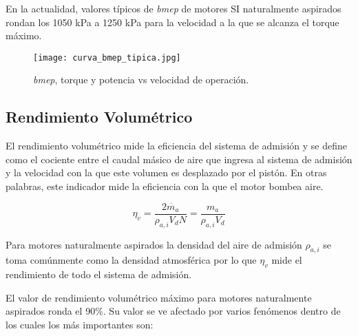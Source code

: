 En la actualidad, valores típicos de \emph{bmep} de motores SI naturalmente
aspirados rondan los 1050 kPa a 1250 kPa para la velocidad a la que se alcanza
el torque máximo.

\begin{figure} \centering
\texttt{[image: curva\_bmep\_tipica.jpg]}
    \caption{\emph{bmep}, torque y potencia vs velocidad de
operación\parencite{heywood}.}
    \label{fig:bmep_tipica}
\end{figure}


\subsection{Rendimiento Volumétrico}
%
El rendimiento volumétrico mide la eficiencia del sistema de admisión y se
define como el cociente entre el caudal másico de aire que ingresa al sistema de
admisión y la velocidad con la que este volumen es desplazado por el pistón.
%
En otras palabras, este indicador mide la eficiencia con la que el motor bombea
aire.

\begin{equation}\label{eq:eta_v} \eta_v = \frac{2\dot{m_a}}{\rho_{a,i}V_d N} = \frac{m_a}{\rho_{a,i}V_d}
\end{equation}

Para motores naturalmente aspirados la densidad del aire de admisión
$\rho_{a,i}$ se toma comúnmente como la densidad atmosférica por lo que $\eta_v$
mide el rendimiento de todo el sistema de admisión.

El valor de rendimiento volumétrico máximo para motores naturalmente aspirados
ronda el 90\%.
%
Su valor se ve afectado por varios fenómenos dentro de los cuales los más
importantes son:

